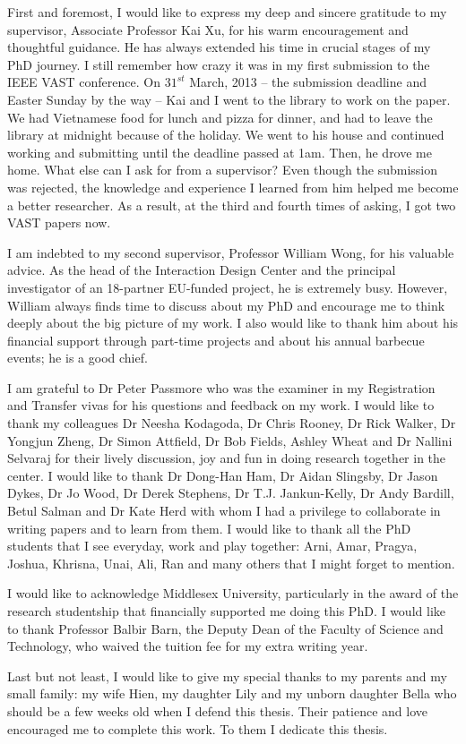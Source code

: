 
\begin{acknowledgements}      
First and foremost, I would like to express my deep and sincere gratitude to my supervisor, Associate Professor Kai Xu, for his warm encouragement and thoughtful guidance. He has always extended his time in crucial stages of my PhD journey. I still remember how crazy it was in my first submission to the IEEE VAST conference. On $31^{st}$ March, 2013 -- the submission deadline and Easter Sunday by the way -- Kai and I went to the library to work on the paper. We had Vietnamese food for lunch and pizza for dinner, and had to leave the library at midnight because of the holiday. We went to his house and continued working and submitting until the deadline passed at 1am. Then, he drove me home. What else can I ask for from a supervisor? Even though the submission was rejected, the knowledge and experience I learned from him helped me become a better researcher. As a result, at the third and fourth times of asking, I got two VAST papers now.

I am indebted to my second supervisor, Professor William Wong, for his valuable advice. As the head of the Interaction Design Center and the principal investigator of an 18-partner EU-funded project, he is extremely busy. However, William always finds time to discuss about my PhD and encourage me to think deeply about the big picture of my work. I also would like to thank him about his financial support through part-time projects and about his annual barbecue events; he is a good chief.

I am grateful to Dr Peter Passmore who was the examiner in my Registration and Transfer vivas for his questions and feedback on my work. I would like to thank my colleagues Dr Neesha Kodagoda, Dr Chris Rooney, Dr Rick Walker, Dr Yongjun Zheng, Dr Simon Attfield, Dr Bob Fields, Ashley Wheat and Dr Nallini Selvaraj for their lively discussion, joy and fun in doing research together in the center. I would like to thank Dr Dong-Han Ham, Dr Aidan Slingsby, Dr Jason Dykes, Dr Jo Wood, Dr Derek Stephens, Dr T.J. Jankun-Kelly, Dr Andy Bardill,  Betul Salman and Dr Kate Herd with whom I had a privilege to collaborate in writing papers and to learn from them. I would like to thank all the PhD students that I see everyday, work and play together: Arni, Amar, Pragya, Joshua, Khrisna, Unai, Ali, Ran and many others that I might forget to mention.

I would like to acknowledge Middlesex University, particularly in the award of the research studentship that financially supported me doing this PhD. I would like to thank Professor Balbir Barn, the Deputy Dean of the Faculty of Science and Technology, who waived the tuition fee for my extra writing year.

Last but not least, I would like to give my special thanks to my parents and my small family: my wife Hien, my daughter Lily and my unborn daughter Bella who should be a few weeks old when I defend this thesis. Their patience and love encouraged me to complete this work. To them I
dedicate this thesis.

\end{acknowledgements}
